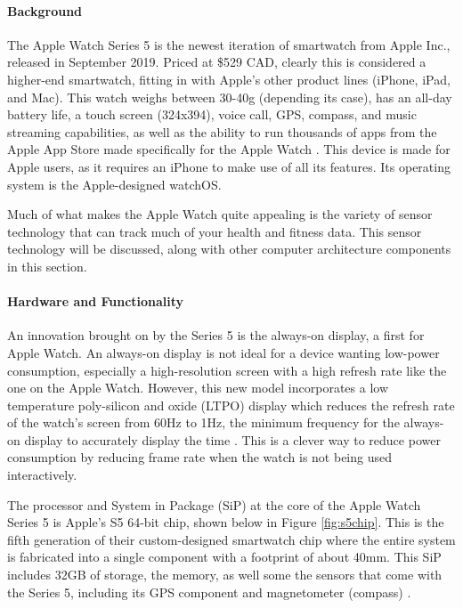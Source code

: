 \paragraph{Background}
The Apple Watch Series 5 is the newest iteration of smartwatch from Apple Inc., released in September
2019. Priced at \$529 CAD, clearly this is considered a higher-end smartwatch, fitting in with Apple's
other product lines (iPhone, iPad, and Mac). This watch weighs between 30-40g (depending its case),
has an all-day battery life, a touch screen (324x394), voice call, GPS, compass, and music streaming capabilities,
as well as the ability to run thousands of apps from the Apple App Store made specifically 
for the Apple Watch \cite{apple_specs}. This device is made for Apple users, as it requires 
an iPhone to make use of all its features. Its operating system is the Apple-designed watchOS.

Much of what makes the Apple Watch quite appealing is the variety of sensor technology that can track
much of your health and fitness data. This sensor technology will be discussed, along with other
computer architecture components in this section.

\paragraph{Hardware and Functionality}
An innovation brought on by the Series 5 is the always-on display, a first for Apple Watch.
An always-on display is not ideal for a device wanting low-power consumption, especially a high-resolution
screen with a high refresh rate like the one on the Apple Watch. However, this new model incorporates
a low temperature poly-silicon and oxide (LTPO) display which reduces the refresh rate of the watch's
screen from 60Hz to 1Hz, the minimum frequency for the always-on display to accurately 
display the time \cite{apple_specs}. This is a clever way to reduce power consumption by reducing frame
rate when the watch is not being used interactively. 

The processor and System in Package (SiP) at the core of the Apple Watch Series 5 is Apple's S5 64-bit chip,
shown below in Figure \ref{fig:s5chip}. This is the fifth generation of their custom-designed 
smartwatch chip where the entire system is fabricated into a single component with a footprint
of about 40mm. This SiP includes 32GB of storage, the memory, as well some the sensors that come with the 
Series 5, including its GPS component and magnetometer (compass) \cite{apple_specs}.

